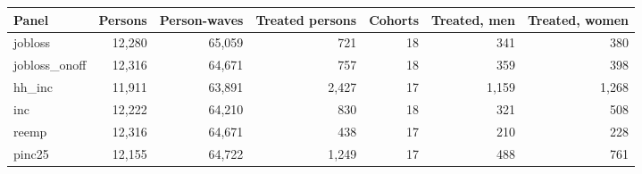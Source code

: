 
\begin{tabular}{lrrrrrr}
\toprule
Panel & Persons & Person-waves & Treated persons & Cohorts & Treated, men & Treated, women\\
\midrule
jobloss & 12,280 & 65,059 & 721 & 18 & 341 & 380\\
jobloss\_onoff & 12,316 & 64,671 & 757 & 18 & 359 & 398\\
hh\_inc & 11,911 & 63,891 & 2,427 & 17 & 1,159 & 1,268\\
inc & 12,222 & 64,210 & 830 & 18 & 321 & 508\\
reemp & 12,316 & 64,671 & 438 & 17 & 210 & 228\\
\addlinespace
pinc25 & 12,155 & 64,722 & 1,249 & 17 & 488 & 761\\
\bottomrule
\end{tabular}
